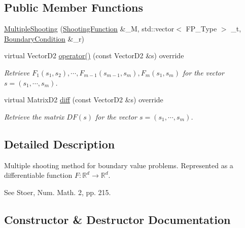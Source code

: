 \subsection*{Public Member Functions}
\begin{DoxyCompactItemize}
\item 
\hyperlink{classMultipleShooting_a3a9dba24831825aca548c7f4e6e0f4f8}{Multiple\+Shooting} (\hyperlink{classShootingFunction}{Shooting\+Function} \&\+\_\+M, std\+::vector$<$ F\+P\+\_\+\+Type $>$ \+\_\+t, \hyperlink{classBoundaryCondition}{Boundary\+Condition} \&\+\_\+r)
\item 
virtual Vector\+D2 \hyperlink{classMultipleShooting_a1893112981f4f8e19a394413def8ddde}{operator()} (const Vector\+D2 \&s) override
\begin{DoxyCompactList}\small\item\em Retrieve $F_1(s_1, s_2),\cdots, F_{m-1}(s_{m-1},s_m), F_m(s_1,s_m)$ for the vector $s = (s_1,\cdots,s_m)$. \end{DoxyCompactList}\item 
virtual Matrix\+D2 \hyperlink{classMultipleShooting_a83febb68d789d4343811eb8ffa75bbf8}{diff} (const Vector\+D2 \&s) override
\begin{DoxyCompactList}\small\item\em Retrieve the matrix $DF(s)$ for the vector $s = (s_1,\cdots,s_m)$. \end{DoxyCompactList}\end{DoxyCompactItemize}


\subsection{Detailed Description}
Multiple shooting method for boundary value problems. Represented as a differentiable function $F: \mathbb{R}^d \rightarrow \mathbb{R}^d$. 

See Stoer, Num. Math. 2, pp. 215. 

\subsection{Constructor \& Destructor Documentation}
\mbox{\label{classMultipleShooting_a3a9dba24831825aca548c7f4e6e0f4f8}} 
